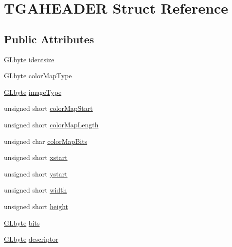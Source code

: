 \hypertarget{struct_t_g_a_h_e_a_d_e_r}{\section{T\-G\-A\-H\-E\-A\-D\-E\-R Struct Reference}
\label{struct_t_g_a_h_e_a_d_e_r}
}
\subsection*{Public Attributes}
\begin{DoxyCompactItemize}
\item 
\hyperlink{_g_l_e_w_2glew_8h_a0a9e8b1f1d9c4bcf1c0bc5d5d4e3608a}{G\-Lbyte} \hyperlink{struct_t_g_a_h_e_a_d_e_r_a7e95180a64f23121916f79bb5a450f67}{identsize}
\item 
\hyperlink{_g_l_e_w_2glew_8h_a0a9e8b1f1d9c4bcf1c0bc5d5d4e3608a}{G\-Lbyte} \hyperlink{struct_t_g_a_h_e_a_d_e_r_afa9624515a431c35cac310dc616cce20}{color\-Map\-Type}
\item 
\hyperlink{_g_l_e_w_2glew_8h_a0a9e8b1f1d9c4bcf1c0bc5d5d4e3608a}{G\-Lbyte} \hyperlink{struct_t_g_a_h_e_a_d_e_r_a25f60fd03b8f3ca45c51570fdf9c37f8}{image\-Type}
\item 
unsigned short \hyperlink{struct_t_g_a_h_e_a_d_e_r_a77b4ee20178980a4c15b4f9964d316a5}{color\-Map\-Start}
\item 
unsigned short \hyperlink{struct_t_g_a_h_e_a_d_e_r_a099159a965bb119e3f0bb6ab51263be2}{color\-Map\-Length}
\item 
unsigned char \hyperlink{struct_t_g_a_h_e_a_d_e_r_ac1ec5898c11a2c2a857135f6491476a8}{color\-Map\-Bits}
\item 
unsigned short \hyperlink{struct_t_g_a_h_e_a_d_e_r_a401e8bd5c99a9b4eb1f2870fb7798451}{xstart}
\item 
unsigned short \hyperlink{struct_t_g_a_h_e_a_d_e_r_a5764ddc4d61823db8ad1d4d52a7fa271}{ystart}
\item 
unsigned short \hyperlink{struct_t_g_a_h_e_a_d_e_r_ae6ddb06ece470aa657b1b7f874a4b9de}{width}
\item 
unsigned short \hyperlink{struct_t_g_a_h_e_a_d_e_r_aec46a067f60610efda8e7253787ba9d5}{height}
\item 
\hyperlink{_g_l_e_w_2glew_8h_a0a9e8b1f1d9c4bcf1c0bc5d5d4e3608a}{G\-Lbyte} \hyperlink{struct_t_g_a_h_e_a_d_e_r_a11419767ec86b64b07aef26f94818075}{bits}
\item 
\hyperlink{_g_l_e_w_2glew_8h_a0a9e8b1f1d9c4bcf1c0bc5d5d4e3608a}{G\-Lbyte} \hyperlink{struct_t_g_a_h_e_a_d_e_r_aaa26be3ddc5aa33fdbbd1bd2fc6aad55}{descriptor}
\end{DoxyCompactItemize}


